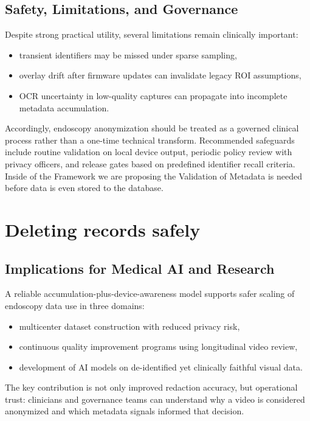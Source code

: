 \documentclass{article}
\begin{document}
\subsection{Safety, Limitations, and Governance}
Despite strong practical utility, several limitations remain clinically
important:
\begin{itemize}
  \item transient identifiers may be missed under sparse sampling,
  \item overlay drift after firmware updates can invalidate legacy ROI
  assumptions,
  \item OCR uncertainty in low-quality captures can propagate into incomplete
  metadata accumulation.
\end{itemize}

Accordingly, endoscopy anonymization should be treated as a governed clinical
process rather than a one-time technical transform. Recommended safeguards
include routine validation on local device output, periodic policy review with
privacy officers, and release gates based on predefined identifier recall
criteria. Inside of the Framework we are proposing the Validation of Metadata is needed before data is even stored to the database.

\section{Deleting records safely}



\subsection{Implications for Medical AI and Research}
A reliable accumulation-plus-device-awareness model supports safer scaling of
endoscopy data use in three domains:
\begin{itemize}
  \item multicenter dataset construction with reduced privacy risk,
  \item continuous quality improvement programs using longitudinal video review,
  \item development of AI models on de-identified yet clinically faithful visual
  data.
\end{itemize}

The key contribution is not only improved redaction accuracy, but operational
trust: clinicians and governance teams can understand why a video is considered
anonymized and which metadata signals informed that decision.
\end{document}
